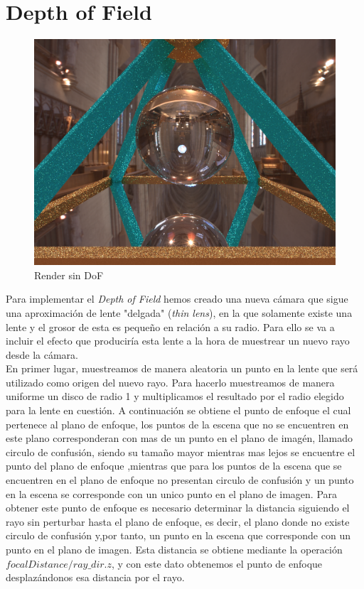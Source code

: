 \documentclass[10pt,oneside,a4paper]{article}
\begin{document}
\section{Depth of Field}

\begin{figure}[h]
\centering
\includegraphics[width=1\linewidth]{images/escena_2400x1800_128spp_dof0-0_screencap.png}
\caption{Render sin DoF}
\label{fig:disp}
\end{figure}

Para implementar el \textit{Depth of Field} hemos creado una nueva cámara que sigue una aproximación de lente "delgada" (\textit{thin lens}), en la que solamente existe una lente y el grosor de esta es pequeño en relación a su radio. Para ello se va a incluir el efecto que produciría esta lente a la hora de muestrear un nuevo rayo desde la cámara.\\

En primer lugar, muestreamos de manera aleatoria un punto en la lente que será utilizado como origen del nuevo rayo. Para hacerlo muestreamos de manera uniforme un disco de radio 1 y multiplicamos el resultado por el radio elegido para la lente en cuestión. A continuación se obtiene el punto de enfoque el cual pertenece al plano de enfoque, los puntos de la escena que no se encuentren en este plano corresponderan con mas de un punto en el plano de imagén, llamado circulo de confusión, siendo su tamaño mayor mientras mas lejos se encuentre el punto del plano de enfoque ,mientras que para los puntos de la escena que se encuentren en el plano de enfoque no presentan circulo de confusión y un punto en la escena se corresponde con un unico punto en el plano de imagen. Para  obtener este punto de enfoque es necesario determinar la distancia siguiendo el rayo sin perturbar hasta el plano de enfoque, es decir, el plano donde no existe circulo de confusión y,por tanto,  un punto en la escena que corresponde con un punto en el plano de imagen. Esta distancia se obtiene mediante la operación $focalDistance/ ray\_dir.z$, y con este dato obtenemos el punto de enfoque desplazándonos esa distancia por el rayo.\\
\end{document}
